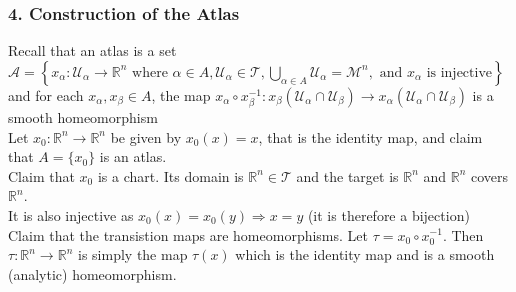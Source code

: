 \documentclass[11pt]{article}
\theoremstyle{thm}
\begin{document}
\subsubsection{4. Construction of the Atlas}
Recall that an atlas is a set $\mathcal{A} = \left\{ x_\alpha: 
\mathcal{U}_\alpha \rightarrow \mathbb{R}^n \text{ where } \alpha \in 
A,\mathcal{U}_\alpha \in \mathcal{T},  \bigcup\limits_{\alpha \in 
A}{\mathcal{U}_\alpha}=\mathcal{M}^n,\text{ and } x_\alpha\text{ is injective} 
\right\}$ and for each $x_{\alpha}, x_{\beta} \in A$, the map $x_\alpha \circ 
x_\beta^{-1} : x_\beta(\mathcal{U}_\alpha \cap \mathcal{U}_\beta) \rightarrow 
x_\alpha(\mathcal{U}_\alpha \cap \mathcal{U}_\beta)$ is a smooth 
homeomorphism\\[1.5em]
Let $x_0: \mathbb{R}^n \rightarrow \mathbb{R}^n$ be given by $x_0(x)=x$, that is the identity map, and claim that $A=\{x_0\}$ is an atlas.\\[1em]
Claim that $x_0$ is a chart. Its domain is $\mathbb{R}^n \in \mathcal{T}$ and 
the target is $\mathbb{R}^n$ and $\mathbb{R}^n$ covers $\mathbb{R}^n$.\\[1em]
It is also injective as $x_0(x)=x_0(y)\Rightarrow x=y$ (it is therefore a 
bijection)\\[1em]
Claim that the transistion maps are homeomorphisms. Let $\tau = x_0 \circ 
x_0^{-1}$. Then $\tau: \mathbb{R}^n \rightarrow \mathbb{R}^n$ is simply the map 
$\tau(x)$ which is the identity map and is a smooth (analytic) homeomorphism.
\end{document}
